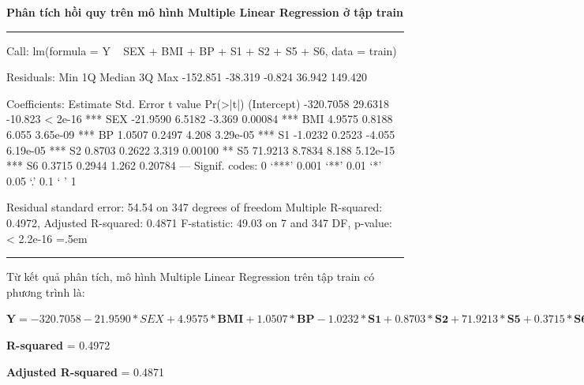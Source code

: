 \documentclass[runningheads]{llncs}
\newenvironment{lcverbatim}
 {\SaveVerbatim{cverb}}
 {\endSaveVerbatim
  \flushleft\fboxrule=0pt\fboxsep=.5em
  \colorbox{cverbbg}{%
    \makebox[\dimexpr\linewidth-2\fboxsep][l]{\BUseVerbatim{cverb}}%
  }
  \endflushleft
}
\begin{document}
\vspace{0.5cm}
\textbf{Phân tích hồi quy trên mô hình Multiple Linear Regression ở tập train}
\vspace{0.5cm}
\hrule
\begin{lcverbatim}
Call:
lm(formula = Y ~ SEX + BMI + BP + S1 + S2 + S5 + S6, data = train)

Residuals:
     Min       1Q   Median       3Q      Max 
-152.851  -38.319   -0.824   36.942  149.420 

Coefficients:
             Estimate Std. Error t value Pr(>|t|)    
(Intercept) -320.7058    29.6318 -10.823  < 2e-16 ***
SEX          -21.9590     6.5182  -3.369  0.00084 ***
BMI            4.9575     0.8188   6.055 3.65e-09 ***
BP             1.0507     0.2497   4.208 3.29e-05 ***
S1            -1.0232     0.2523  -4.055 6.19e-05 ***
S2             0.8703     0.2622   3.319  0.00100 ** 
S5            71.9213     8.7834   8.188 5.12e-15 ***
S6             0.3715     0.2944   1.262  0.20784    
---
Signif. codes:  0 ‘***’ 0.001 ‘**’ 0.01 ‘*’ 0.05 ‘.’ 0.1 ‘ ’ 1

Residual standard error: 54.54 on 347 degrees of freedom
Multiple R-squared:  0.4972,	Adjusted R-squared:  0.4871 
F-statistic: 49.03 on 7 and 347 DF,  p-value: < 2.2e-16
\end{lcverbatim}
\hrule
\vspace{0.5cm}

Từ kết quả phân tích, mô hình Multiple Linear Regression trên tập train có phương trình là:
\begin{center}
	$\textbf{Y}=  -320.7058 -21.9590* SEX + 4.9575*\textbf{BMI} +  1.0507*\textbf{BP} -
	1.0232*\textbf{S1} + 0.8703*\textbf{S2} + 71.9213*\textbf{S5} + 0.3715*\textbf{S6} $
\end{center}

\textbf{R-squared} = 0.4972

\textbf{Adjusted R-squared} = 0.4871
\end{document}
